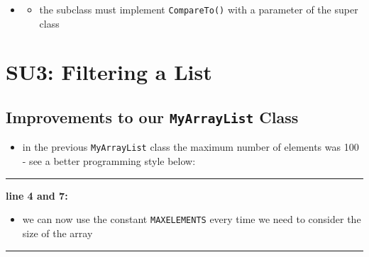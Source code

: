 
\begin{itemize}
    \item []{}
        \begin{itemize}
            \item [2.] the subclass must implement \texttt{CompareTo()} with a parameter of the super class
        \end{itemize}
\end{itemize}


\newpage

\section{SU3: Filtering a List}

\subsection{Improvements to our \texttt{MyArrayList} Class}

\begin{itemize}
    \item[1.] in the previous \texttt{MyArrayList} class the maximum number of elements was 100 - see a better programming style below:
\end{itemize}


\vspace{0.1cm}
\noindent
\textcolor{RedOrange}{\rule{\textwidth}{0.5pt}}
\vspace{-0.1cm}

\noindent
\begin{minipage}{0.15\textwidth}
    \textcolor{RedOrange}{\textbf{line 4 and 7:}}
\end{minipage}
\begin{minipage}{0.85\textwidth}
    \begin{itemize}
        \item[] we can now use the constant \texttt{MAXELEMENTS} every time we need to consider the size of the array
    \end{itemize}
\end{minipage}

\vspace{0.1cm}
\noindent
\textcolor{RedOrange}{\rule{\textwidth}{0.5pt}}

